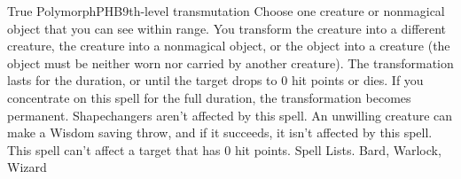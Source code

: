 \begin{spell}{True Polymorph}{PHB}{9th-level transmutation}
{
}
Choose one creature or nonmagical object that you can see within range. You transform the creature into a different creature, the creature into a nonmagical object, or the object into a creature (the object must be neither worn nor carried by another creature). The transformation lasts for the duration, or until the target drops to 0 hit points or dies. If you concentrate on this spell for the full duration, the transformation becomes permanent.
Shapechangers aren't affected by this spell. An unwilling creature can make a Wisdom saving throw, and if it succeeds, it isn't affected by this spell.
This spell can't affect a target that has 0 hit points.
Spell Lists. Bard, Warlock, Wizard
\end{spell}

